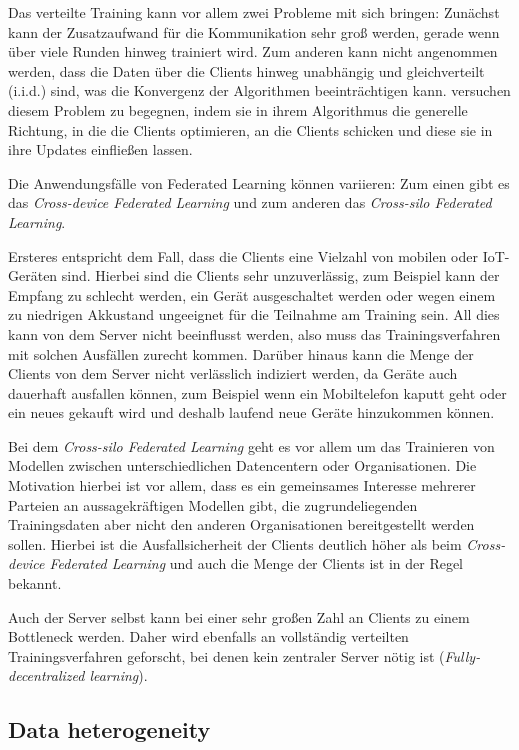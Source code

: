 Das verteilte Training kann vor allem zwei Probleme mit sich bringen: Zunächst kann der Zusatzaufwand für die Kommunikation sehr groß werden, gerade wenn über viele Runden hinweg trainiert wird. Zum anderen kann nicht angenommen werden, dass die Daten über die Clients hinweg unabhängig und gleichverteilt (i.i.d.) sind, was die Konvergenz der Algorithmen beeinträchtigen kann. \textcite{karimireddy:2020} versuchen diesem Problem zu begegnen, indem sie in ihrem Algorithmus die generelle Richtung, in die die Clients optimieren, an die Clients schicken und diese sie in ihre Updates einfließen lassen.

Die Anwendungsfälle von Federated Learning können variieren: Zum einen gibt es das \textit{Cross-device Federated Learning} und zum anderen das \textit{Cross-silo Federated Learning}\cite{kairouz:2021}. 

Ersteres entspricht dem Fall, dass die Clients eine Vielzahl von mobilen oder IoT-Geräten sind. Hierbei sind die Clients sehr unzuverlässig, zum Beispiel kann der Empfang zu schlecht werden, ein Gerät ausgeschaltet werden oder wegen einem zu niedrigen Akkustand ungeeignet für die Teilnahme am Training sein. All dies kann von dem Server nicht beeinflusst werden, also muss das Trainingsverfahren mit solchen Ausfällen zurecht kommen. Darüber hinaus kann die Menge der Clients von dem Server nicht verlässlich indiziert werden, da Geräte auch dauerhaft ausfallen können, zum Beispiel wenn ein Mobiltelefon kaputt geht oder ein neues gekauft wird und deshalb laufend neue Geräte hinzukommen können.

Bei dem \textit{Cross-silo Federated Learning} geht es vor allem um das Trainieren von Modellen zwischen unterschiedlichen Datencentern oder Organisationen. Die Motivation hierbei ist vor allem, dass es ein gemeinsames Interesse mehrerer Parteien an aussagekräftigen Modellen gibt, die zugrundeliegenden Trainingsdaten aber nicht den anderen Organisationen bereitgestellt werden sollen. Hierbei ist die Ausfallsicherheit der Clients deutlich höher als beim \textit{Cross-device Federated Learning} und auch die Menge der Clients ist in der Regel bekannt.

Auch der Server selbst kann bei einer sehr großen Zahl an Clients zu einem Bottleneck werden.\cite[p.11]{kairouz:2021} Daher wird ebenfalls an vollständig verteilten Trainingsverfahren geforscht, bei denen kein zentraler Server nötig ist (\textit{Fully-decentralized learning}).

\subsection{Data heterogeneity}\label{fund-fl-data-heterogenity}

